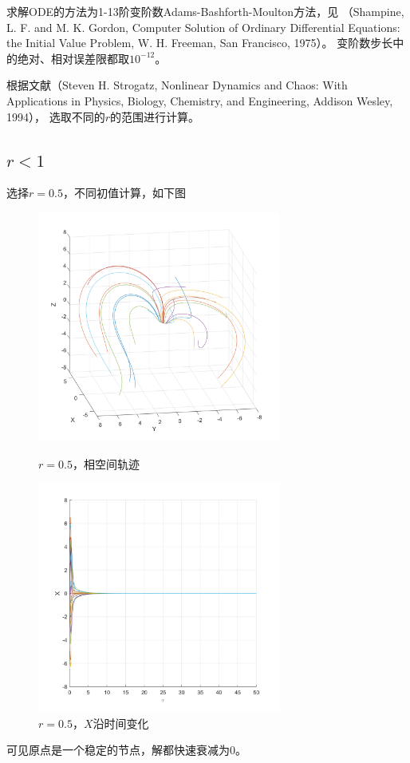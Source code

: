 \documentclass[UTF8,zihao=5]{ctexart} %
\begin{document}
求解ODE的方法为1-13阶变阶数Adams-Bashforth-Moulton方法，见
（Shampine, L. F. and M. K. Gordon, Computer Solution of Ordinary Differential Equations: the Initial Value Problem, W. H. Freeman, San Francisco, 1975）。
变阶数步长中的绝对、相对误差限都取$10^{-12}$。

根据文献（Steven H. Strogatz, Nonlinear Dynamics and Chaos: With Applications in Physics, Biology, Chemistry, and Engineering, Addison Wesley, 1994），
选取不同的$r$的范围进行计算。

\subsection{$r<1$}

选择$r=0.5$，不同初值计算，如下图
\begin{figure}[H]
    \begin{minipage}[c]{0.45\linewidth}  %
        \centering
        \includegraphics[width=8cm]{XYZ_r_0.5.png}  %
        \caption{$r=0.5$，相空间轨迹}
    \end{minipage}
    \hfill %
    \begin{minipage}[c]{0.45\linewidth}  %
        \centering
        \includegraphics[width=8cm]{XT_r_0.5.png}  %
        \caption{$r=0.5$，$X$沿时间变化}
    \end{minipage}
\end{figure}
可见原点是一个稳定的节点，解都快速衰减为0。
\end{document}
